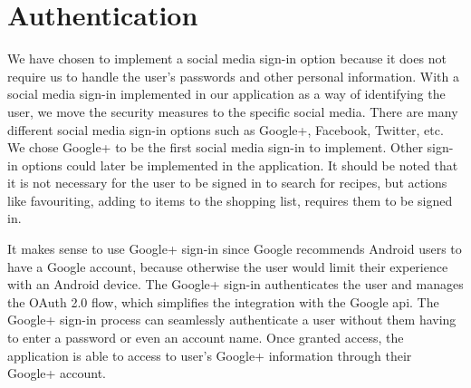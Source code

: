 \section{Authentication}
We have chosen to implement a social media sign-in option because it does not require us to handle the user's passwords and other personal information. With a social media sign-in implemented in our application as a way of identifying the user, we move the security measures to the specific social media.
There are many different social media sign-in options such as Google+, Facebook, Twitter, etc. We chose Google+ to be the first social media sign-in to implement. Other sign-in options could later be implemented in the application. It should be noted that it is not necessary for the user to be signed in to search for recipes, but actions like favouriting, adding to items to the shopping list, requires them to be signed in.

It makes sense to use Google+ sign-in since Google recommends Android users to have a Google account, because otherwise the user would limit their experience with an Android device. 
The Google+ sign-in authenticates the user and manages the OAuth 2.0 flow, which simplifies the integration with the Google \ac{api}.
The Google+ sign-in process can seamlessly authenticate a user without them having to enter a password or even an account name. 
Once granted access, the application is able to access to user's Google+ information through their Google+ account\cite{googleplusvideo}.

